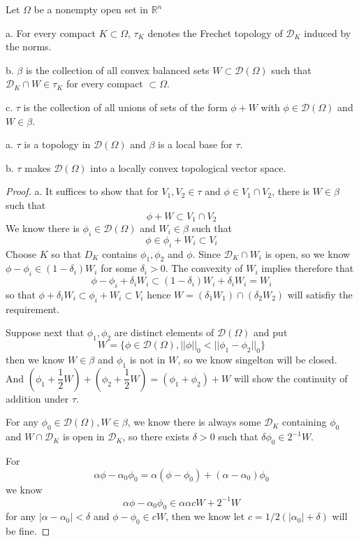 \documentclass[lang=en, color=blue, ]{elegantbook}
\newcommand{\R}{\mathbb{R}}
\newcommand{\D}{\mathscr{D}}
\begin{document}
\begin{definition}
    Let $\Omega$ be a nonempty open set in $\R^n$\par
    a. For every compact $K\subset \Omega$, $\tau_K$ denotes the Frechet topology of $\D_K$ induced by the norms.\par
    b. $\beta$ is the collection of all convex balanced sets $W\subset\D(\Omega)$ such that $\D_K\cap W \in \tau_K$ for every compact  $\subset \Omega$.\par
    c. $\tau$ is the collection of all unions of sets of the form $\phi+W$ with $\phi \in \D(\Omega)$ and $W\in \beta$. 
\end{definition}

\begin{theorem}
    a. $\tau$ is a topology in $\D(\Omega)$ and $\beta$ is a local base for $\tau$.\par
    b. $\tau$ makes $\D(\Omega)$ into a locally convex topological vector space.
\end{theorem}
\begin{proof}
    a. It suffices to show that for $V_1,V_2 \in \tau$ and $\phi \in V_1\cap V_2$, there is $W \in \beta$ such that
    \[\phi + W \subset V_1\cap V_2\]
    We know there is $\phi_i\in\D(\Omega)$ and $W_i\in\beta$ such that
    \[
    \phi \in \phi_i + W_i\subset V_i
    \]
    Choose $K$ so that $D_K$ contains $\phi_1,\phi_2$ and $\phi$. Since $\D_K\cap W_i$ is open, so we know $\phi-\phi_i \in (1-\delta_i)W_i$ for some $\delta_i > 0$. The convexity of $W_i$ implies therefore that
    \[\phi - \phi_i + \delta_iW_i\subset (1-\delta_i)W_i+\delta_iW_i = W_i\]
    so that $\phi+\delta_iW_i \subset \phi_i+W_i \subset V_i$ hence $W = (\delta_1W_1)\cap(\delta_2W_2)$ will satisfiy the requirement.\par
    Suppose next that $\phi_1,\phi_2$ are distinct elements of $\D(\Omega)$ and put
    \[W = \{\phi \in \D(\Omega), ||\phi||_0 < ||\phi_1-\phi_2||_0\}\]
    then we know $W\in\beta$ and $\phi_1$ is not in $W$, so we know singelton will be closed. And $(\phi_1 + \dfrac{1}{2}W)+(\phi_2 + \dfrac{1}{2}W) = (\phi_1+\phi_2)+W$ will show the continuity of addition under $\tau$.\par
    For any $\phi_0 \in \D(\Omega), W\in\beta$, we know there is always some $\D_K$ containing $\phi_0$ and $W\cap \D_K$ is open in $\D_K$, so there exists $\delta > 0$ such that $\delta \phi_0 \in 2^{-1}W$.\par
    For
    \[\alpha \phi - \alpha_0\phi_0 = \alpha(\phi-\phi_0)+(\alpha-\alpha_0)\phi_0\]
    we know
    \[
    \alpha\phi - \alpha_0\phi_0 \in \alpha \alpha cW + 2^{-1}W
    \]
    for any $|\alpha - \alpha_0| < \delta$ and $\phi-\phi_0 \in cW$, then we know let $c = 1/2(|\alpha_0|+\delta)$ will be fine.
\end{proof}
\end{document}

